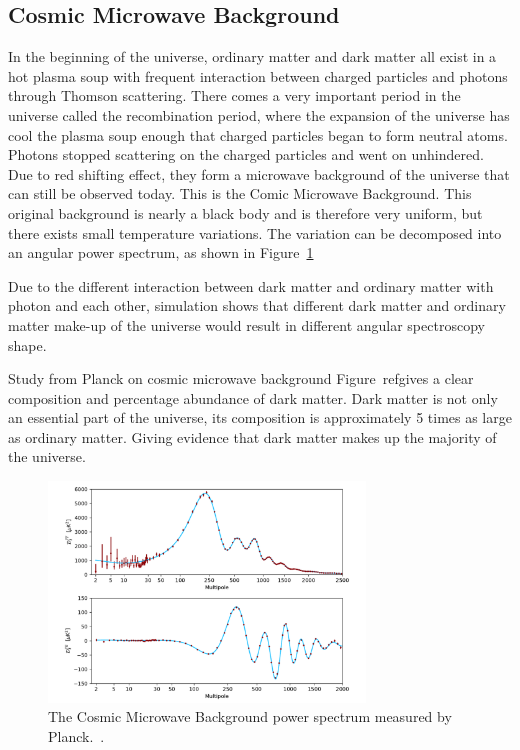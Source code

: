 \subsection{Cosmic Microwave Background}

    In the beginning of the universe, ordinary matter and dark matter all exist in a hot plasma soup with frequent interaction between charged particles and photons through Thomson scattering. There comes a very important period in the universe called the recombination period, where the expansion of the universe has cool the plasma soup enough that charged particles began to form neutral atoms. Photons stopped scattering on the charged particles and went on unhindered. Due to red
shifting effect, they form a microwave background of the universe that can still be observed today. This is the Comic Microwave Background. 
This original background is nearly a black body and is therefore very uniform, but there exists small temperature variations. The variation can be decomposed into an angular power spectrum, as shown in Figure~\ref{fig:CMB_figure}

Due to the different interaction between dark matter and ordinary matter with photon and each other, simulation shows that different dark matter and ordinary matter make-up of the universe would result in different angular spectroscopy shape. 

Study from Planck on cosmic microwave background Figure~refgives a clear composition and percentage abundance of dark matter. Dark matter is not only an essential part of the universe, its composition is approximately 5 times as large as ordinary matter. Giving evidence that dark matter makes up the majority of the universe. 

\begin{figure}[!htb]
    \begin{center}
        \includegraphics[width=0.75\textwidth]{figures/chapter_DM/CMB-angular-power-spectrum}
        \caption{
			The Cosmic Microwave Background power spectrum measured by Planck.~\cite{CMB}.
        }
        \label{fig:CMB_figure}
    \end{center}
\end{figure}


